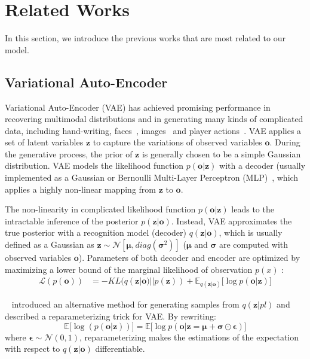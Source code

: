 \documentclass[letterpaper]{article} %
\newcommand{\latentvariables}{\mathbf{z}}
\newcommand{\inference}{q}
\newcommand{\generation}{p}
\newcommand{\player}{pl}
\newcommand{\observation}{\boldsymbol{o}}
\begin{document}
\section{Related Works}
In this section, we introduce the previous works that are most related to our model.

\subsection{Variational Auto-Encoder}
Variational Auto-Encoder (VAE) has achieved promising performance in recovering multimodal distributions and in generating many kinds of complicated data, including hand-writing, faces~\cite{kingma2013auto}, images~\cite{gregor2015draw} and player actions~\cite{mehrasa2019variational}.
VAE applies a set of latent variables $\latentvariables$ to capture the variations of observed variables $\observation$.
During the generative process, the prior of $\latentvariables$ is generally chosen to be a simple Gaussian distribution.
VAE models the likelihood function $\generation(\observation|\latentvariables)$ with a decoder (usually implemented as a Gaussian or Bernoulli Multi-Layer Perceptron (MLP)~\cite{kingma2013auto}, which applies a highly non-linear mapping from $\latentvariables$ to $\observation$.

The non-linearity in complicated likelihood function $\generation(\observation|\latentvariables)$ leads to the intractable inference of the posterior $p(\latentvariables|\observation)$. Instead, VAE approximates the true posterior with a recognition model (decoder) $\inference(\latentvariables|\observation)$, which is usually defined as a Gaussian as $\latentvariables\sim\mathcal{N}[\boldsymbol{\mu}, diag(\boldsymbol{\sigma}^{2})]$ ($\boldsymbol{\mu}$ and $\boldsymbol{\sigma}$ are computed with observed variables $\observation$).
Parameters of both decoder and encoder are optimized by maximizing a lower bound of the marginal likelihood of observation $p(x)$ :
\begin{align}
     \mathcal{L}(p(\observation))&=-KL(\inference(\latentvariables|\observation)||p(\latentvariables))+\mathbb{E}_{\inference(\latentvariables|\observation)}\Big[\log\generation(\observation|\latentvariables)\Big]
\end{align}

~\cite{kingma2013auto} introduced an alternative method for generating samples from $\inference(\latentvariables|\player)$ and described a reparameterizing trick for VAE. By rewriting:
\begin{equation}
    \mathbb{E}\Big[\log(\generation(\observation|\latentvariables))\Big]=\mathbb{E}\Big[\log \generation(\observation|\latentvariables=\boldsymbol{\mu}+\boldsymbol{\sigma}\odot\boldsymbol{\epsilon})\Big]
\end{equation}
where $\boldsymbol{\epsilon}\sim\mathcal{N}(0,1)$, reparameterizing makes the estimations of the expectation with respect to $\inference(\latentvariables|\observation)$ differentiable.
\end{document}
